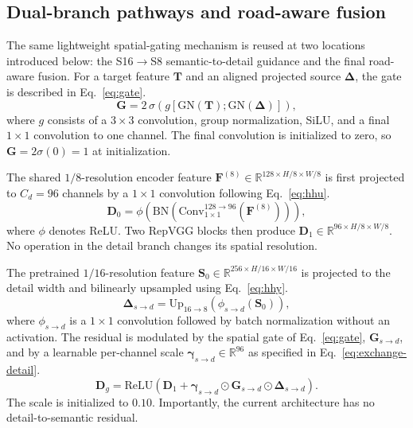 \documentclass[a4paper,fleqn, review]{cas-sc}
\begin{document}
\subsection{Dual-branch pathways and road-aware fusion}
\label{subsec:dualres}

\label{subsec:gate}
The same lightweight spatial-gating mechanism is reused at two locations
introduced below: the S16$\rightarrow$S8 semantic-to-detail guidance and the
final road-aware fusion. For a target feature $\mathbf{T}$ and an aligned
projected source $\boldsymbol{\Delta}$, the gate is described in Eq.~\eqref{eq:gate}.
%
\begin{equation}
\label{eq:gate}
\mathbf{G}=2\,\sigma\!\left(
g\!\left[
\mathrm{GN}(\mathbf{T});
\mathrm{GN}(\boldsymbol{\Delta})
\right]\right),
\end{equation}
%
where $g$ consists of a $3\times3$ convolution, group normalization, SiLU,
and a final $1\times1$ convolution to one channel. The final convolution is
initialized to zero, so $\mathbf{G}=2\sigma(0)=1$ at initialization.

The shared $1/8$-resolution encoder feature
$\mathbf{F}^{(8)}\in\mathbb{R}^{128\times H/8\times W/8}$ is first projected
to $C_d=96$ channels by a $1\times1$ convolution following Eq.~\eqref{eq:hhu}.
%
\begin{equation}
\label{eq:hhu}
\mathbf{D}_0 =
\phi\!\left(\mathrm{BN}\!\left(
\mathrm{Conv}_{1\times1}^{128\rightarrow96}
(\mathbf{F}^{(8)})\right)\right),
\end{equation}
%
where $\phi$ denotes ReLU. Two RepVGG blocks then produce
$\mathbf{D}_1\in\mathbb{R}^{96\times H/8\times W/8}$. No operation in the
detail branch changes its spatial resolution.

The pretrained $1/16$-resolution feature
$\mathbf{S}_0\in\mathbb{R}^{256\times H/16\times W/16}$ is projected to the
detail width and bilinearly upsampled using Eq.~\eqref{eq:hhy}.
%
\begin{equation}
\label{eq:hhy}
\boldsymbol{\Delta}_{s\rightarrow d}
=
\mathrm{Up}_{16\rightarrow8}
\left(
\phi_{s\rightarrow d}(\mathbf{S}_0)
\right),
\end{equation}
%
where $\phi_{s\rightarrow d}$ is a $1\times1$ convolution followed by batch
normalization without an activation. The residual is modulated by the
spatial gate of Eq.~\eqref{eq:gate}, $\mathbf{G}_{s\rightarrow d}$, and by a
learnable per-channel scale
$\boldsymbol{\gamma}_{s\rightarrow d}\in\mathbb{R}^{96}$ as specified in Eq.~\eqref{eq:exchange-detail}.
%
\begin{equation}
\label{eq:exchange-detail}
\mathbf{D}_{g}=
\mathrm{ReLU}\!\left(
\mathbf{D}_1+
\boldsymbol{\gamma}_{s\rightarrow d}
\odot
\mathbf{G}_{s\rightarrow d}
\odot
\boldsymbol{\Delta}_{s\rightarrow d}
\right).
\end{equation}
%
The scale is initialized to $0.10$. Importantly, the current architecture has
no detail-to-semantic residual.
\end{document}
